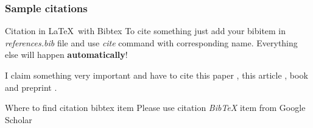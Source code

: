 \documentclass{beamer}
\begin{document}
\begin{frame}
    \frametitle{Sample citations}

    \begin{block}{Citation in \LaTeX\ with Bibtex}
        To cite something just add your
        bibitem in \textit{references.bib} file and
        use \textit{cite} command with corresponding name.
        Everything else will happen \textbf{automatically}!
    \end{block}

    I claim something very important and have to
    cite this paper \cite{goodfellow2014generative},
    this article \cite{unet},
    book \cite{pix2pixHD}
    and preprint \cite{pix2pix}.

    \begin{alertblock}{Where to find citation bibtex item}
        Please use citation \textit{BibTeX} item
        from Google Scholar
    \end{alertblock}

\end{frame}
\end{document}
